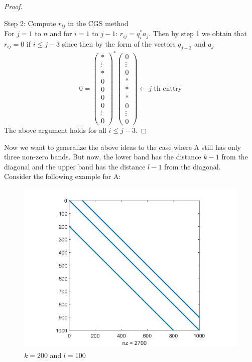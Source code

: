 \documentclass{report}
\numberwithin{pic}{section}
\numberwithin{lem}{section}
\numberwithin{thm}{section}
\numberwithin{cor}{section}
\theoremstyle{definition}
\numberwithin{ex}{section}
\numberwithin{defn}{section}
\theoremstyle{definition}
\theoremstyle{remark}
\begin{document}
\begin{proof}
\begin{description}
\end{description}
Step 2: Compute $r_{ij}$ in the CGS method\\
For $j=1$ to $n$ and for $i=1$ to $j-1$: $r_{ij}= q_i^*a_j$.
Then by step 1 we obtain that $r_{ij}=0$ if $i\leq j-3$ since then by the form of the vectors $q_{j-3}$ and $a_j$
\[0=\begin{pmatrix}
* \\ 
\vdots  \\ 
* \\ 
0 \\ 
0 \\
0\\
0 \\
\vdots \\ 
0
\end{pmatrix}^*\begin{pmatrix}
0 \\ 
\vdots  \\ 
0 \\ 
* \\ 
* \\ 
*\\
0\\
\vdots\\
0
\end{pmatrix} \leftarrow j\text{-th enttry} \]
The above argument holds for all $i\leq j-3$. 
\end{proof}
Now we want to generalize the above ideas to the case where A still has only three non-zero bands.
But now, the lower band has the distance $k-1$ from the diagonal and the upper band has the distance $l-1$ from the diagonal.\\
Consider the following example for A: 
\begin{figure}[	H]
\includegraphics[scale=0.3]{example1.jpg}
\caption{$k=200$ and $l=100$}
\end{figure}
\end{document}
